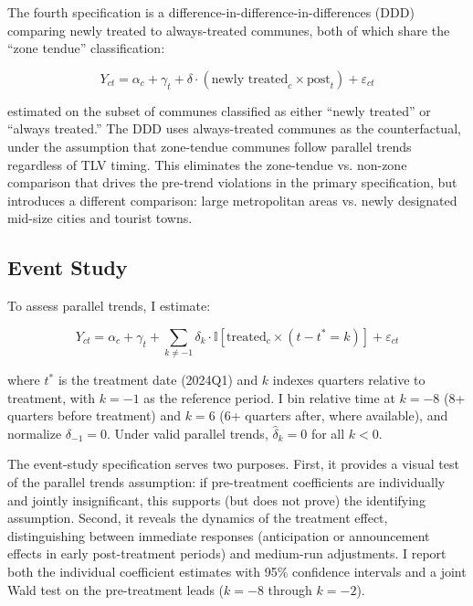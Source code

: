 \documentclass[12pt]{article}
\newcommand{\ind}{\mathbb{I}}
\begin{document}
The fourth specification is a difference-in-difference-in-differences (DDD) comparing newly treated to always-treated communes, both of which share the ``zone tendue'' classification:

\begin{equation}\label{eq:ddd}
Y_{ct} = \alpha_c + \gamma_t + \delta \cdot (\text{newly treated}_c \times \text{post}_t) + \varepsilon_{ct}
\end{equation}

\noindent estimated on the subset of communes classified as either ``newly treated'' or ``always treated.'' The DDD uses always-treated communes as the counterfactual, under the assumption that zone-tendue communes follow parallel trends regardless of TLV timing. This eliminates the zone-tendue vs. non-zone comparison that drives the pre-trend violations in the primary specification, but introduces a different comparison: large metropolitan areas vs. newly designated mid-size cities and tourist towns.

\subsection{Event Study}

To assess parallel trends, I estimate:

\begin{equation}\label{eq:es}
Y_{ct} = \alpha_c + \gamma_t + \sum_{k \neq -1} \delta_k \cdot \ind[\text{treated}_c \times (t - t^* = k)] + \varepsilon_{ct}
\end{equation}

\noindent where $t^*$ is the treatment date (2024Q1) and $k$ indexes quarters relative to treatment, with $k = -1$ as the reference period. I bin relative time at $k = -8$ (8+ quarters before treatment) and $k = 6$ (6+ quarters after, where available), and normalize $\delta_{-1} = 0$. Under valid parallel trends, $\hat{\delta}_k = 0$ for all $k < 0$.

The event-study specification serves two purposes. First, it provides a visual test of the parallel trends assumption: if pre-treatment coefficients are individually and jointly insignificant, this supports (but does not prove) the identifying assumption. Second, it reveals the dynamics of the treatment effect, distinguishing between immediate responses (anticipation or announcement effects in early post-treatment periods) and medium-run adjustments. I report both the individual coefficient estimates with 95\% confidence intervals and a joint Wald test on the pre-treatment leads ($k = -8$ through $k = -2$).
\end{document}
